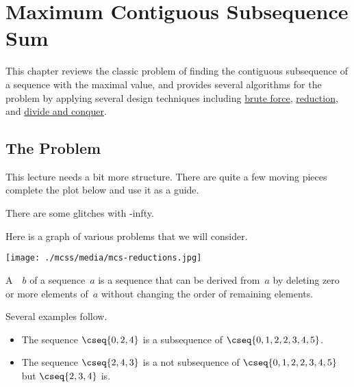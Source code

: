 \chapter{Maximum Contiguous Subsequence Sum}
\label{ch:mcss}

\begin{preamble}
This chapter reviews the classic problem of finding the contiguous
subsequence of a sequence with the maximal value, 
%
and provides several algorithms for the problem by applying several design techniques including
\href{sec:design::bf}{brute force},
%
\href{sec:design::reduction}{reduction}, and
%
\href{ch:design::dc}{divide and conquer}.
%

\end{preamble}


\section{The Problem}
\label{ch:mcss::problem}

\begin{teachnote}
This lecture needs a bit more structure.  There are quite a few moving
pieces complete the plot below and use it as a guide.  

There are some glitches with -infty.  
\end{teachnote}

\begin{teachnote}

Here is a graph of various problems that we will consider.

\texttt{[image: ./mcss/media/mcs-reductions.jpg]}

\end{teachnote}

\begin{flex}
\begin{definition}[Subsequence]
\label{def:mcss::introduction::subseq}

A~~$b$ of a sequence~$a$ is a sequence that can be
derived from~$a$ by deleting zero or more elements of~$a$ without changing the
order of remaining elements. 
%
\end{definition}

\begin{example}
Several examples follow.
\begin{itemize}
\item
The sequence $\cseq{0,2,4}$ is a subsequence of
$\cseq{0,1,2,2,3,4,5}$.

\item
The sequence $\cseq{2,4,3}$ is a not
subsequence of $\cseq{0,1,2,2,3,4,5}$ but $\cseq{2,3,4}$ is.
\end{itemize}
%
\end{example}
\end{flex}


